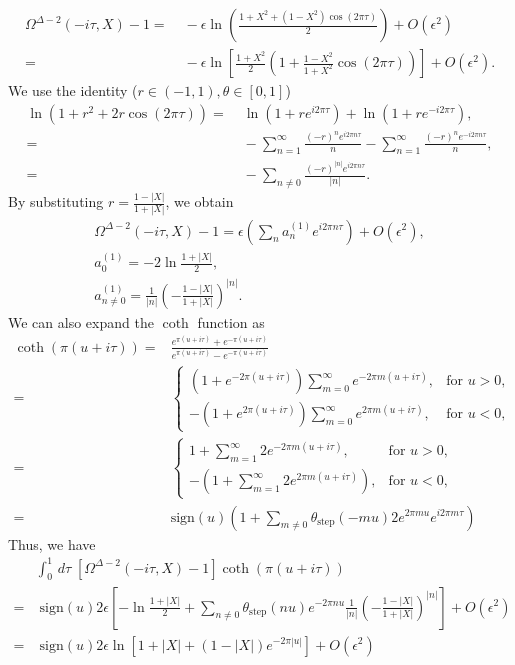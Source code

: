 \documentclass[a4paper,11pt]{article}
\theoremstyle{definition}
\begin{document}
\begin{align}
    \Omega^{\Delta-2}(-i\tau,X) - 1 =&\; - \epsilon \ln \left(\frac{1+X^2+(1-X^2)\cos(2\pi \tau)}{2}\right) + O(\epsilon^2)\\
    =&\; - \epsilon \ln \left[\frac{1+X^2}{2}\left(1+\frac{1-X^2}{1+X^2}\cos(2\pi \tau)\right)\right] + O(\epsilon^2). %
\end{align}
We use the identity ($r\in (-1,1), \theta\in[0,1]$)
\begin{align}
    \ln(1+r^2 + 2r\cos(2\pi\tau)) =&\; \ln(1+re^{i2\pi\tau}) + \ln (1+re^{-i2\pi\tau}),\\
    =&\; -\sum_{n= 1}^{\infty} \frac{(-r)^n e^{i2\pi n\tau}}{n} -\sum_{n= 1}^{\infty} \frac{(-r)^n e^{-i2\pi n\tau}}{n}, \\
    =&\; -\sum_{n \neq 0} \frac{(-r)^{|n|}e^{i2\pi n\tau}}{|n|} .
\end{align}
By substituting $r = \frac{1-|X|}{1+|X|}$, we obtain
\begin{gather}
    \Omega^{\Delta-2}(-i\tau,X) - 1 = \epsilon \left(\sum_{n} a_n^{(1)}e^{i2 \pi n \tau} \right) + O(\epsilon^2),\\
    a_0^{(1)} =  -2\ln \frac{1+|X|}{2},\\
    a_{n \neq 0}^{(1)} = \frac{1}{|n|} \left(-\frac{1-|X|}{1+|X|}\right)^{|n|}.
\end{gather}
We can also expand the $\coth$ function as
\begin{align}
    \coth(\pi (u+i\tau)) =& \frac{e^{\pi (u+i\tau)}+e^{-\pi (u+i\tau)}}{e^{\pi (u+i\tau)}-e^{-\pi (u+i\tau)}} \nonumber\\
    =& \begin{cases}
        (1+e^{-2\pi (u+i\tau)}) \sum_{m=0}^{\infty} e^{-2\pi m (u+i\tau)}, & \text{for } u > 0,\\
        -(1+e^{2\pi (u+i\tau)}) \sum_{m=0}^{\infty} e^{2\pi m (u+i\tau)}, & \text{for } u < 0,
    \end{cases}\\
    =& \begin{cases}
        1+\sum_{m=1}^{\infty} 2e^{-2\pi m (u+i\tau)}, & \text{for } u > 0,\\
        -(1+\sum_{m=1}^{\infty} 2e^{2\pi m (u+i\tau)}), & \text{for } u < 0,
    \end{cases}\\
    =&\text{sign}(u) \left(1+ \sum_{m \neq 0 } \theta_{\text{step}}(-mu)2 e^{2\pi m u} e^{i2\pi m \tau}\right)
\end{align}
Thus, we have
\begin{align}
    &\int_0^1 \, d\tau \; \left[\Omega^{\Delta-2}(-i\tau,X) -1\right] \coth(\pi(u+i\tau)) \nonumber\\
    =&\; \text{sign}(u)2\epsilon\left[-\ln\frac{1+|X|}{2}+\sum_{n\neq0} \theta_{\text{step}}(nu) e^{-2\pi n u} \frac{1}{|n|}\left(-\frac{1-|X|}{1+|X|}\right)^{|n|} \right] +O(\epsilon^2)\\
    =&\; \text{sign}(u)2\epsilon\ln\left[1+|X| +(1-|X|)e^{-2\pi|u|}\right] +O(\epsilon^2)
\end{align}
\end{document}

